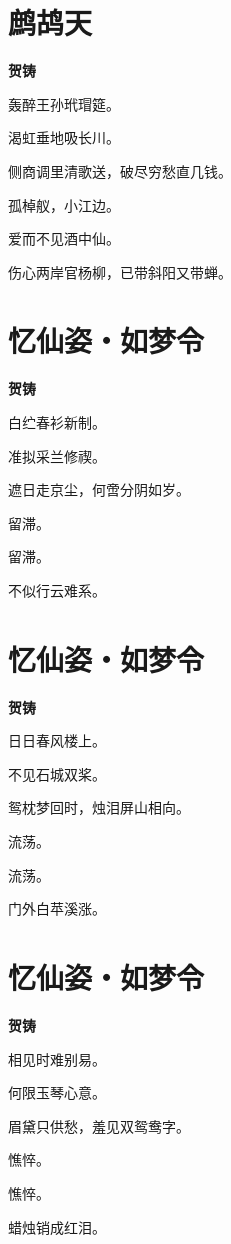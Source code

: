 \documentclass[12pt,a4paper]{ctexbook}
\begin{document}
\section{鹧鸪天}
\textbf{贺铸}\par\vspace{0.5em}
轰醉王孙玳瑁筵。\par
渴虹垂地吸长川。\par
侧商调里清歌送，破尽穷愁直几钱。\par
孤棹舣，小江边。\par
爱而不见酒中仙。\par
伤心两岸官杨柳，已带斜阳又带蝉。\par

\section{忆仙姿・如梦令}
\textbf{贺铸}\par\vspace{0.5em}
白纻春衫新制。\par
准拟采兰修禊。\par
遮日走京尘，何啻分阴如岁。\par
留滞。\par
留滞。\par
不似行云难系。\par

\section{忆仙姿・如梦令}
\textbf{贺铸}\par\vspace{0.5em}
日日春风楼上。\par
不见石城双桨。\par
鸳枕梦回时，烛泪屏山相向。\par
流荡。\par
流荡。\par
门外白苹溪涨。\par

\section{忆仙姿・如梦令}
\textbf{贺铸}\par\vspace{0.5em}
相见时难别易。\par
何限玉琴心意。\par
眉黛只供愁，羞见双鸳鸯字。\par
憔悴。\par
憔悴。\par
蜡烛销成红泪。\par
\end{document}
